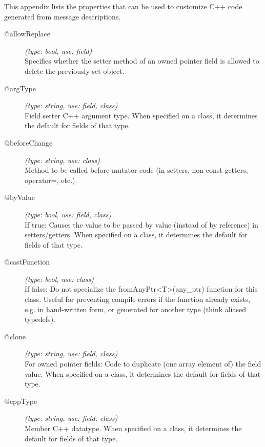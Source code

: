 \label{cha:msg-properties}

This appendix lists the properties that can be used to customize C++ code
generated from message descriptions.

%
%

\begin{description}
\item[@allowReplace] \textit{(type: bool, use: field)} \\
  Specifies whether the setter method of an owned pointer field is allowed to
  delete the previously set object.

\item[@argType] \textit{(type: string, use: field, class)} \\
  Field setter C++ argument type. When specified on a class, it determines the
  default for fields of that type.

\item[@beforeChange] \textit{(type: string, use: class)} \\
  Method to be called before mutator code (in setters, non-const getters,
  operator=, etc.).

\item[@byValue] \textit{(type: bool, use: field, class)} \\
  If true: Causes the value to be passed by value (instead of by reference) in
  setters/getters. When specified on a class, it determines the default for
  fields of that type.

\item[@castFunction] \textit{(type: bool, use: class)} \\
  If false: Do not specialize the fromAnyPtr<T>(any\_ptr) function for this
  class. Useful for preventing compile errors if the function already exists,
  e.g. in hand-written form, or generated for another type (think aliased
  typedefs).

\item[@clone] \textit{(type: string, use: field, class)} \\
  For owned pointer fields: Code to duplicate (one array element of) the field
  value. When specified on a class, it determines the default for fields of
  that type.

\item[@cppType] \textit{(type: string, use: field, class)} \\
  Member C++ datatype. When specified on a class, it determines the default
  for fields of that type.


\end{description}
